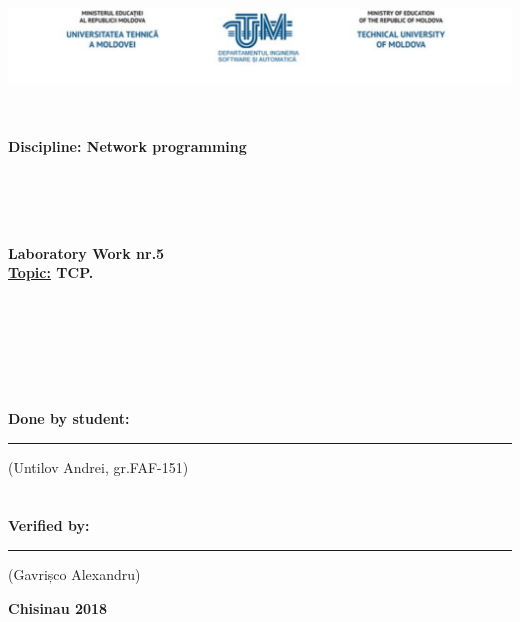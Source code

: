 
\begin{center}
	\includegraphics[scale=0.5]{img_title_amsi} 
\end{center} 
\ \\
\begin{flushright}
	\textbf{{\fontsize{14}{10}\selectfont Discipline: Network programming}}
\end{flushright}
\ \\
\ \\
\ \\

\begin{center}
	\textbf{{\fontsize{15}{10}\selectfont Laboratory Work nr.5 \\
	\underline{Topic:} TCP.}}
\end{center}
\ \\
\ \\
\ \\
\ \\
\ \\
\begin{flushright}
	{\fontsize{12}{10}\selectfont 
		\textbf{Done by student:}  \rule{2cm}{0.4pt}(Untilov Andrei, gr.FAF-151) \\
		\ \\
		\ \\
		\textbf{Verified by:}      \rule{2cm}{0.4pt}(Gavrișco Alexandru)
		
		}
\end{flushright}
\vfill

\begin{center}
	\textbf{Chisinau 2018}
\end{center}
